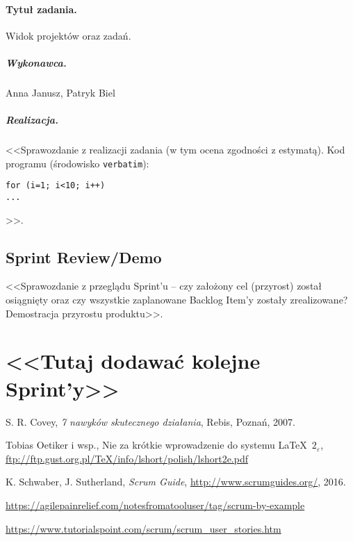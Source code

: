﻿\documentclass[a4paper]{article}
\begin{document}
\paragraph{Tytuł zadania.} Widok projektów oraz zadań.
\subparagraph{Wykonawca.} Anna Janusz, Patryk Biel
\subparagraph{Realizacja.} <<Sprawozdanie z realizacji zadania (w tym ocena zgodności z estymatą). Kod programu (środowisko \texttt{verbatim}): \begin{verbatim}
for (i=1; i<10; i++)
...
\end{verbatim}>>.


\subsection{Sprint Review/Demo}
<<Sprawozdanie z przeglądu Sprint'u -- czy założony cel (przyrost) został osiągnięty oraz czy wszystkie zaplanowane Backlog Item'y zostały zrealizowane? Demostracja przyrostu produktu>>.

\section*{<<Tutaj dodawać kolejne Sprint'y>>}


\begin{thebibliography}{9}

 S. R. Covey, {\em 7 nawyków skutecznego działania}, Rebis, Poznań, 2007.

 Tobias Oetiker i wsp., Nie za krótkie wprowadzenie do systemu \LaTeX  \ $2_\varepsilon$, \url{ftp://ftp.gust.org.pl/TeX/info/lshort/polish/lshort2e.pdf}

 K. Schwaber, J. Sutherland, {\em Scrum Guide}, \url{http://www.scrumguides.org/}, 2016.

 \url{https://agilepainrelief.com/notesfromatooluser/tag/scrum-by-example}

 \url{https://www.tutorialspoint.com/scrum/scrum_user_stories.htm}

\end{thebibliography}
\end{document}
